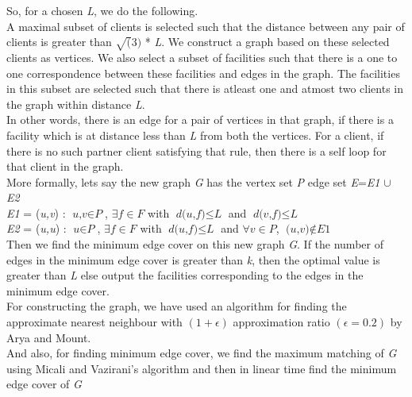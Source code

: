 \documentclass[12pt, a4paper]{article}
\begin{document}
So, for a chosen \textit{L}, we do the following. \\ 
A maximal subset of clients is selected such that the distance between any pair of clients is greater than $\sqrt(3)$ * \textit{L}. We construct a graph based on these selected clients as vertices. We also select a subset of facilities such that there is a one to one correspondence between these facilities and edges in the graph. The facilities in this subset are selected such that there is atleast one and atmost two clients in the graph within distance \textit{L}.\\
In other words, there is an edge for a pair of vertices in that graph, if there is a facility which is at distance less than \textit{L} from both the vertices. For a client, if there is no such partner client satisfying that rule, then there is a self loop for that client in the graph. \\
More formally, lets say the new graph \textit{G} has the vertex set \textit{P} edge set \textit{E}=\textit{E1} $\cup$ \textit{E2} \\
  \textit{E1} = {(\textit{u,v}) : $\textit{u,v} \in \textit{P}$, $\exists\textit{f} \in \textit{F}$ with $\textit{d(u,f)} \leq \textit{L}$ and $\textit{d(v,f)} \leq \textit{L}$} \\
 \textit{E2} = {(\textit{u,u}) : $\textit{u} \in \textit{P}$, $\exists\textit{f} \in \textit{F}$ with $\textit{d(u,f)} \leq \textit{L}$ and $\forall \textit{v} \in \textit{P}$, $\textit{(u,v)} \notin \textit{E1}$} \\
Then we find the minimum edge cover on this new graph \textit{G}. If the number of edges in the minimum edge cover is greater than \textit{k}, then the optimal value is greater than \textit{L} else output the facilities corresponding to the edges in the minimum edge cover. \\
 
For constructing the graph, we have used an algorithm for finding the approximate nearest neighbour with $(1+\epsilon)$ approximation ratio $(\epsilon=0.2)$ by Arya and Mount.\\
And also, for finding minimum edge cover, we find the maximum matching of \textit{G} using Micali and Vazirani's algorithm and then in linear time find the minimum edge cover of \textit{G} \\

  
\end{document}
